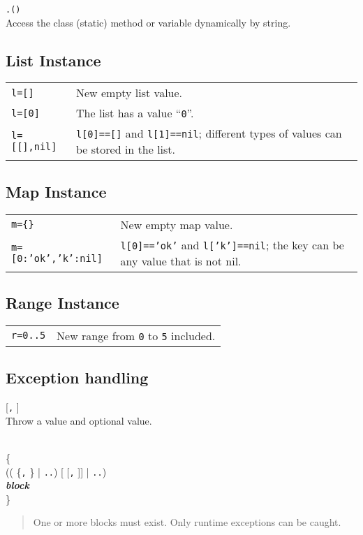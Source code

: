 \hangpar {}\texttt{.(}\texttt{)}\\
Access the class (static) method or variable dynamically by string.


\subsection*{List Instance}
\begin{tabular}{@{}lp{}}
\texttt{l=[]} & New empty list value. \\
\texttt{l=[0]} & The list has a value ``\texttt{0}''. \\
\texttt{l=[[],nil]} & \texttt{l[0]==[]} and \texttt{l[1]==nil}; different types of values can be stored in the list. \\
\end{tabular}

\subsection*{Map Instance}
\begin{tabular}{@{}lp{}}
    \texttt{m=\{\}} & New empty map value. \\
    \texttt{m=[0:'ok','k':nil]} & \texttt{l[0]=='ok'} and \texttt{l['k']==nil}; the key can be any value that is not nil.\\
\end{tabular}


\subsection*{Range Instance}
\begin{tabular}{@{}lp{}}
    \texttt{r=0..5} & New range from \texttt{0} to \texttt{5} included. \\
\end{tabular}

\subsection*{Exception handling}
\hangpar {}  [\texttt{,} ]\\
Throw a  value and optional  value.

\noindent {}\\
\hphantom{m} \{\\
 (( \{\texttt{,} \} | \texttt{..}) [  [\texttt{,} ]] | \texttt{..}) \textit{\\
\hphantom{m}\textbf{block}}\\
\} 
\begin{quote}
    One or more  blocks must exist. Only runtime exceptions can be caught.
\end{quote}

